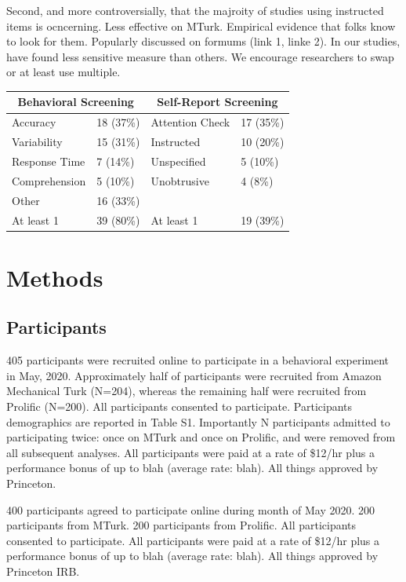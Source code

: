 \documentclass[a4paper,notitlepage,12pt]{article}
\begin{document}
Second, and more controversially, that the majroity of studies using instructed items is ocncerning. Less effective on MTurk. Empirical evidence that folks know to look for them. Popularly discussed on formums (link 1, linke 2). In our studies, have found less sensitive measure than others. We encourage researchers to swap or at least use multiple.  

\begin{tabular}{ |p{3cm}||p{3cm}|p{3cm}|p{3cm}|  }
 \hline
 \multicolumn{2}{|c|}{Behavioral Screening} &
 \multicolumn{2}{|c|}{Self-Report Screening} \\
 \hline
 Accuracy & 18 (37\%) & Attention Check & 17 (35\%) \\
 Variability & 15 (31\%) & Instructed & 10 (20\%) \\
 Response Time & 7 (14\%) & Unspecified &  5 (10\%) \\
 Comprehension & 5 (10\%) & Unobtrusive &  4 (8\%) \\
 Other & 16 (33\%) & &  \\
 \hline
 At least 1 & 39 (80\%) & At least 1 & 19 (39\%) \\
 \hline
\end{tabular}

\section{Methods}

\subsection{Participants}

405 participants were recruited online to participate in a behavioral experiment in May, 2020. Approximately half of participants were recruited from Amazon Mechanical Turk (N=204), whereas the remaining half were recruited from Prolific (N=200). All participants consented to participate. Participants demographics are reported in Table S1. Importantly N participants admitted to participating twice: once on MTurk and once on Prolific, and were removed from all subsequent analyses.  All participants were paid at a rate of \$12/hr plus a performance bonus of up to blah (average rate: blah). All things approved by Princeton. 

400 participants agreed to participate online during month of May 2020. 200 participants from MTurk. 200 participants from Prolific. All participants consented to participate. All participants were paid at a rate of \$12/hr plus a performance bonus of up to blah (average rate: blah). All things approved by Princeton IRB.  
\end{document}
